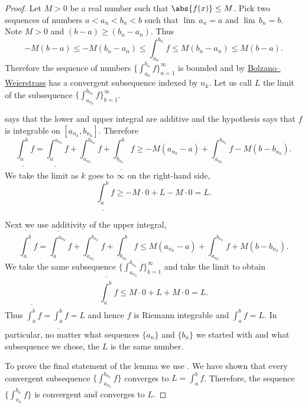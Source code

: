 \documentclass[12pt]{book}
\begin{document}
\begin{proof}
Let $M > 0$ be a real number such that $\abs{f(x)} \leq M$.
Pick two
sequences of numbers $a < a_n < b_n < b$ such that $\lim\, a_n = a$
and $\lim\, b_n = b$.
Note $M > 0$ and $(b-a) \geq (b_n-a_n)$.
Thus
\begin{equation*}
-M(b-a) \leq
-M(b_n-a_n) \leq
\int_{a_n}^{b_n} f
\leq
M(b_n-a_n) \leq
M(b-a) .
\end{equation*}
Therefore the sequence of numbers
$\{ \int_{a_n}^{b_n} f \}_{n=1}^\infty$ is bounded and by
\hyperref[thm:bwseq]{Bolzano--Weierstrass}
has a convergent subsequence indexed by $n_k$.
Let us call
$L$ the limit of the subsequence
$\{ \int_{a_{n_k}}^{b_{n_k}} f \}_{k=1}^\infty$.

 says that
the lower and upper integral are additive
and the hypothesis says that
$f$ is integrable on $[a_{n_k},b_{n_k}]$.
Therefore
\begin{equation*}
\underline{\int_a^b} f
=
\underline{\int_a^{a_{n_k}}} f
+
\int_{a_{n_k}}^{b_{n_k}} f
+
\underline{\int_{b_{n_k}}^b} f
\geq
-M(a_{n_k}-a)
+
\int_{a_{n_k}}^{b_{n_k}} f
-
M(b-b_{n_k}) .
\end{equation*}
We take the limit as $k$ goes to $\infty$ on the right-hand side,
\begin{equation*}
\underline{\int_a^b} f
\geq
-M\cdot 0
+
L
-
M\cdot 0
= L .
\end{equation*}

Next we use additivity of the upper integral,
\begin{equation*}
\overline{\int_a^b} f
=
\overline{\int_a^{a_{n_k}}} f
+
\int_{a_{n_k}}^{b_{n_k}} f
+
\overline{\int_{b_{n_k}}^b} f
\leq
M(a_{n_k}-a)
+
\int_{a_{n_k}}^{b_{n_k}} f
+
M(b-b_{n_k}) .
\end{equation*}
We take the same subsequence 
$\{ \int_{a_{n_k}}^{b_{n_k}} f \}_{k=1}^\infty$ and take the limit 
to obtain
\begin{equation*}
\overline{\int_a^b} f
\leq
M\cdot 0
+
L
+
M\cdot 0
= L .
\end{equation*}
Thus $\overline{\int_a^b} f = \underline{\int_a^b} f = L$
and hence $f$ is Riemann integrable and $\int_a^b f = L$.
In particular, no matter what sequences $\{ a_n \}$ and
$\{b_n\}$ we started with and what subsequence we chose,
the $L$ is the same number.

To prove the final statement of the lemma we use 
.
We have shown that every convergent
subsequence
$\{ \int_{a_{n_k}}^{b_{n_k}} f \}$ converges to $L = \int_a^b f$.
Therefore, the sequence
$\{ \int_{a_n}^{b_n} f \}$ is convergent and converges to $L$.
\end{proof}
\end{document}
